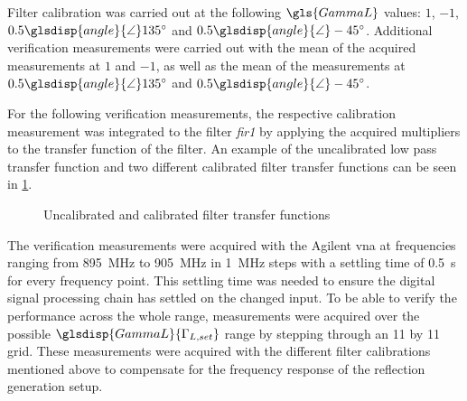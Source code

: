\documentclass[12pt,a4paper,parskip=full,abstract=true,BCOR=12mm,twoside,open=right]{scrreprt}
\providecommand{\abs}[1]{\lvert#1\rvert}
\def\device#1{\mbox{\textit{#1}}}
\newcommand{\Angle}{\glsdisp{angle}{\angle}}
\begin{document}
Filter calibration was carried out at the following $\gls{GammaL}$
values: $1$, $-1$, $0.5\Angle\SI{135}{\degree}$ and $0.5\Angle\SI{-45}{\degree}$. Additional
verification measurements were carried out with the mean of the acquired measurements
at $1$ and $-1$, as well as the mean of the measurements at $0.5\Angle\SI{135}{\degree}$
and $0.5\Angle\SI{-45}{\degree}$.

For the following verification measurements, the respective calibration measurement
was integrated to the filter \device{fir1} by applying the acquired multipliers
to the transfer function of the filter. An example of the uncalibrated low pass
transfer function and two different calibrated filter transfer functions can be
seen in \cref{fig:filter}.

\begin{figure}[htb]
    \centering
    \caption{Uncalibrated and calibrated filter transfer functions}
    \label{fig:filter}
\end{figure}

The verification measurements were acquired with the Agilent \gls{vna} at frequencies
ranging from \SI{895}{\mega\hertz} to \SI{905}{\mega\hertz} in \SI{1}{\mega\hertz} steps
with a settling time of \SI{0.5}{\second} for every frequency point. This settling time
was needed to ensure the digital signal processing chain has settled on the changed input.
To be able to verify the performance across the whole range, measurements were acquired over the possible
$\glsdisp{GammaL}{\Gamma_{L,set}}$ range by stepping through an 11 by 11 grid. These measurements were
acquired with the different filter calibrations mentioned above to compensate for the
frequency response of the reflection generation setup.
\end{document}
